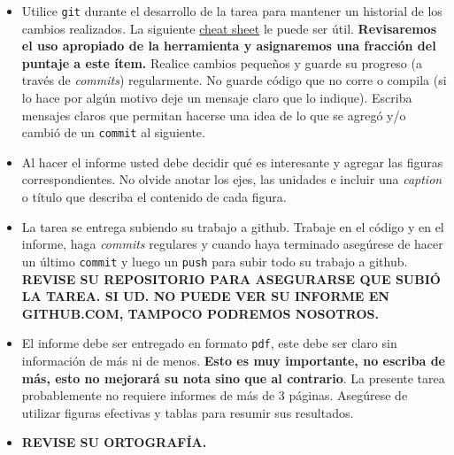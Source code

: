 \documentclass[letter, 11pt]{article}
\begin{document}
\begin{itemize}
\item Utilice \texttt{git} durante el desarrollo de la tarea para mantener un
  historial de los cambios realizados. La siguiente
  \href{https://education.github.com/git-cheat-sheet-education.pdf}{cheat
    sheet} le puede ser útil. {\bf Revisaremos el uso apropiado de la
  herramienta y asignaremos una fracción del puntaje a este ítem.} Realice
  cambios pequeños y guarde su progreso (a través de \emph{commits})
  regularmente. No guarde código que no corre o compila (si lo hace por algún
  motivo deje un mensaje claro que lo indique). Escriba mensajes claros que
  permitan hacerse una idea de lo que se agregó y/o cambió de un
  \texttt{commit} al siguiente.

\item Al hacer el informe usted debe decidir qué es interesante y agregar las
  figuras correspondientes. No olvide anotar los ejes, las unidades e incluir
  una \emph{caption} o título que describa el contenido de cada figura.

\item La tarea se entrega subiendo su trabajo a github. Trabaje en el código y
  en el informe, haga \textit{commits} regulares y cuando haya terminado
  asegúrese de hacer un último \texttt{commit} y luego un \texttt{push} para
  subir todo su trabajo a github. \textbf{REVISE SU REPOSITORIO PARA ASEGURARSE
  QUE SUBIÓ LA TAREA. SI UD. NO PUEDE VER SU INFORME EN GITHUB.COM, TAMPOCO
PODREMOS NOSOTROS.}

\item El informe debe ser entregado en formato \texttt{pdf}, este debe ser
  claro sin información de más ni de menos. \textbf{Esto es muy importante, no
  escriba de más, esto no mejorará su nota sino que al contrario}. La presente
  tarea probablemente no requiere informes de más de 3 páginas. Asegúrese de
  utilizar figuras efectivas y tablas para resumir sus resultados.

\item \textbf{REVISE SU ORTOGRAFÍA.}


\end{itemize}
\end{document}

